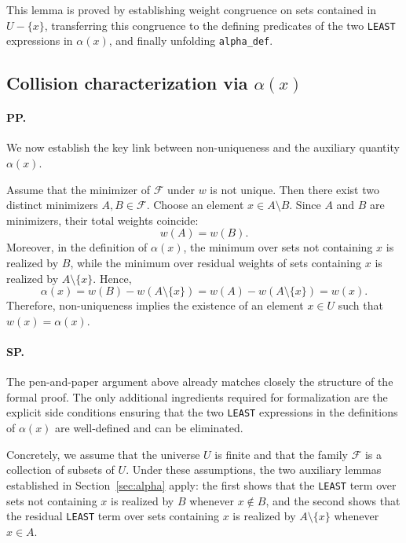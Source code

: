 This lemma is proved by establishing weight congruence on sets contained in $U - \{x\}$, transferring this congruence to the defining predicates of the two \texttt{LEAST} expressions in $\alpha(x)$, and finally unfolding \texttt{alpha\_def}.


\subsection{Collision characterization via \texorpdfstring{$\alpha(x)$}{alpha(x)}}
\label{sec:collision}

\paragraph{PP.}
We now establish the key link between non-uniqueness and the auxiliary quantity $\alpha(x)$.

Assume that the minimizer of $\mathcal{F}$ under $w$ is not unique.
Then there exist two distinct minimizers $A,B \in \mathcal{F}$.
Choose an element $x \in A \setminus B$.
Since $A$ and $B$ are minimizers, their total weights coincide:
\[
w(A) = w(B).
\]
Moreover, in the definition of $\alpha(x)$, the minimum over sets not containing $x$ is realized by $B$, while the minimum over residual weights of sets containing $x$ is realized by $A \setminus \{x\}$.
Hence,
\[
\alpha(x) = w(B) - w(A \setminus \{x\})
= w(A) - w(A \setminus \{x\})
= w(x).
\]
Therefore, non-uniqueness implies the existence of an element $x \in U$ such that $w(x) = \alpha(x)$.

\paragraph{SP.}

The pen-and-paper argument above already matches closely the structure of the formal proof.
The only additional ingredients required for formalization are the explicit side conditions ensuring that the two \texttt{LEAST} expressions in the definitions of $\alpha(x)$ are well-defined and can be eliminated.

Concretely, we assume that the universe $U$ is finite and that the family $\mathcal{F}$ is a collection of subsets of $U$.
Under these assumptions, the two auxiliary lemmas established in Section~\ref{sec:alpha} apply:
the first shows that the \texttt{LEAST} term over sets not containing $x$ is realized by $B$ whenever $x \notin B$,
and the second shows that the residual \texttt{LEAST} term over sets containing $x$ is realized by $A \setminus \{x\}$ whenever $x \in A$.

